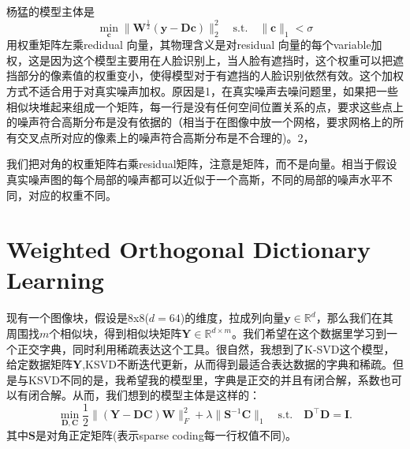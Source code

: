 \documentclass[10pt,twocolumn,letterpaper]{article}
\begin{document}
杨猛的模型主体是
\begin{equation}
\min_{\mathbf{c}}\|\mathbf{W}^{\frac{1}{2}}(\mathbf{y}-\mathbf{D}\mathbf{c})\|_{2}^{2}
\quad
\text{s.t.}
\quad
\|\mathbf{c}\|_{1}<\sigma
\end{equation}
用权重矩阵左乘redidual 向量，其物理含义是对residual 向量的每个variable加权，这是因为这个模型主要用在人脸识别上，当人脸有遮挡时，这个权重可以把遮挡部分的像素值的权重变小，使得模型对于有遮挡的人脸识别依然有效。这个加权方式不适合用于对真实噪声加权。原因是1，在真实噪声去噪问题里，如果把一些相似块堆起来组成一个矩阵，每一行是没有任何空间位置关系的点，要求这些点上的噪声符合高斯分布是没有依据的（相当于在图像中放一个网格，要求网格上的所有交叉点所对应的像素上的噪声符合高斯分布是不合理的)。2，

我们把对角的权重矩阵右乘residual矩阵，注意是矩阵，而不是向量。相当于假设真实噪声图的每个局部的噪声都可以近似于一个高斯，不同的局部的噪声水平不同，对应的权重不同。

\section{Weighted Orthogonal Dictionary Learning}
现有一个图像块，假设是8x8($d=64$)的维度，拉成列向量$\mathbf{y}\in\mathbb{R}^{d}$，那么我们在其周围找$m$个相似块，得到相似块矩阵$\mathbf{Y}\in\mathbb{R}^{d\times m}$。我们希望在这个数据里学习到一个正交字典，同时利用稀疏表达这个工具。很自然，我想到了K-SVD这个模型，给定数据矩阵$\mathbf{Y}$,KSVD不断迭代更新，从而得到最适合表达数据的字典和稀疏。但是与KSVD不同的是，我希望我的模型里，字典是正交的并且有闭合解，系数也可以有闭合解。从而，我们想到的模型主体是这样的：
\begin{equation}
\min_{\mathbf{D},\mathbf{C}}\frac{1}{2}\|(\mathbf{Y}-\mathbf{D}\mathbf{C})\mathbf{W}\|_{F}^{2}
+
\lambda\|\mathbf{S}^{-1}\mathbf{C}\|_{1}
\quad
\text{s.t.}
\quad
\mathbf{D}^{\top}\mathbf{D} =\mathbf{I}. 
\end{equation}
其中$\mathbf{S}$是对角正定矩阵(表示sparse coding每一行权值不同)。
\end{document}
